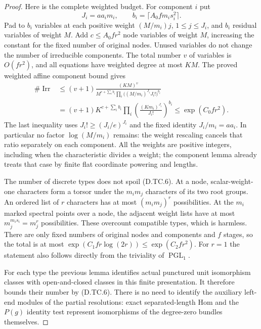 \begin{proof}
Here is the complete weighted budget.
For component $i$ put
\[
 J_i=aa_i m_i,\qquad
 b_i=\lceil A_0 f m_i s_i^2\rceil.                     \tag{D.TC.5}
\]
Pad to $b_i$ variables at each
positive weight $(M/m_i)j$, $1\leq j\leq J_i$,
and $b_i$ residual variables of weight
$M$. Add $c\leq A_0fr^2$ node variables
of weight $M$, increasing the constant
for the fixed number of original nodes.
Unused variables do not change the
number of irreducible components.
The total number $v$ of variables
is $O(fr^2)$, and all equations have
weighted degree at most $KM$.
The proved weighted affine component
bound gives
\[
 \begin{split}
 \#\operatorname{Irr}
 &\leq (v+1)
 \frac{(KM)^v}
 {M^{c+\sum_i b_i}
  \prod_i\bigl((M/m_i)^{J_i}J_i!\bigr)^{b_i}}\\
 &=(v+1)K^{c+\sum_i b_i}
       \prod_i\left(\frac{(K m_i)^{J_i}}{J_i!}\right)^{b_i}
 \leq \exp(C_0fr^2).
 \end{split}                                           \tag{D.TC.6}
\]
The last inequality uses $J_i!\geq(J_i/e)^{J_i}$
and the fixed identity $J_i/m_i=aa_i$.
In particular no factor $\log(M/m_i)$
remains: the weight rescaling cancels
that ratio separately on each component.
All the weights are positive integers,
including when the characteristic
divides a weight; the component lemma
already treats that case by finite
flat coordinate powering and lengths.

The number of discrete types does not
spoil (D.TC.6). At a node, scalar-weight-one
characters form a torsor under the
$m_im_j$ characters of its two root
groups. An ordered list of $r$ characters
has at most $(m_im_j)^r$ possibilities.
At the $m_i$ marked spectral points
over a node, the adjacent weight lists
have at most $m_j^{m_is_i}=m_j^r$
possibilities. These overcount compatible
types, which is harmless. There are
only fixed numbers of original nodes
and components and $f$ stages, so the
total is at most
$\exp(C_1fr\log(2r))\leq\exp(C_2fr^2)$.
For $r=1$ the statement also follows
directly from the triviality of
$\operatorname{PGL}_1$.

For each type the previous lemma
identifies actual punctured unit
isomorphism classes with open-and-closed
classes in this finite presentation.
It therefore bounds their number by
(D.TC.6). There is no need to identify
the auxiliary left-end modules of
the partial resolutions: exact
separated-length Hom and the
$P(g)$ identity test represent
isomorphisms of the degree-zero
bundles themselves.


\end{proof}
